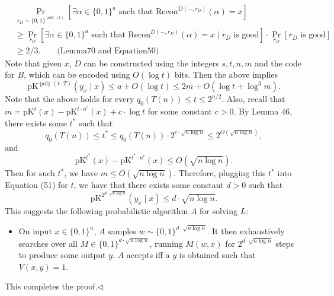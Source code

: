 \begin{align*}
&\Pr_{r_D\sim\{0,1\}^{\operatorname{poly}(t)}}[\exists\alpha\in\{0,1\}^a\text{ such that }\mathrm{Recon}^{D(-;r_D)}(\alpha)=x]\\
&\geq\Pr_{r_D}[\exists\alpha\in\{0,1\}^a\text{ such that }\mathrm{Recon}^{D(-,r_D)}(\alpha)=x\mid r_D\text{ is good}]\cdot\Pr_{r_D}[r_D\text{ is good}]\\
&\geq2/3.\qquad\text{(Lemma70 and Equation50)}
\end{align*}
Note that given $x$, $D$ can be constructed using the integers $s,t,n,m$ and the code for $B$, which can be encoded using $O(\log t)$ bits. Then the above implies
\[\mathrm{pK}^{\operatorname{poly}(t\cdot T)}(y_x\mid x)\leq a+O(\log t)\leq2m+O(\log t+\log^3m).\tag{51}\]
Note that the above holds for every $q_0(T(n))\leq t\leq2^{n/2}$. Also, recall that $m=\mathrm{pK}^t(x)-\mathrm{pK}^{t\cdot n^c}(x)+c\cdot\log t$ for some constant $c>0$. By Lemma 46, there exists some $t^*$ such that
\[q_0(T(n))\leq t^*\leq q_0(T(n))\cdot2^{c\cdot\sqrt{n\log n}}\leq2^{O(\sqrt{n\log n})},\]
and
\[\mathrm{pK}^{t^*}(x)-\mathrm{pK}^{t^*\cdot n^c}(x)\leq O(\sqrt{n\log n}).\]
Then for such $t^*$, we have $m\leq O(\sqrt{n\log n})$. Therefore, plugging this $t^*$ into Equation (51) for $t$, we have that there exists some constant $d>0$ such that
\[\mathrm{pK}^{2^{d\cdot\sqrt{n\log n}}}(y_x\mid x)\leq d\cdot\sqrt{n\log n}.\]
This suggests the following probabilistic algorithm $A$ for solving $L$:
\begin{itemize}
\item On input $x\in\{0,1\}^n$, $A$ samples $w\sim\{0,1\}^{d\cdot\sqrt{n\log n}}$. It then exhaustively searches over all $M\in\{0,1\}^{d\cdot\sqrt{n\log n}}$, running $M(w,x)$ for $2^{d\cdot\sqrt{n\log n}}$ steps to produce some output $y$. $A$ accepts iff a $y$ is obtained such that $V(x,y)=1$.
\end{itemize}
This completes the proof.\hfill$\triangleleft$

